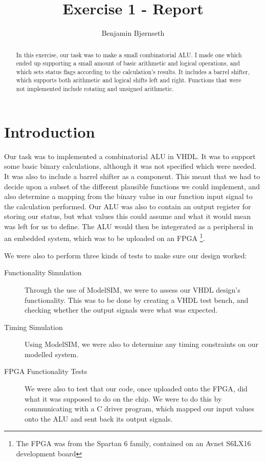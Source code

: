 \documentclass{article}
\title{Exercise 1 - Report}
\author{Benjamin Bj\o rnseth}
\begin{document}
\maketitle 
\begin{abstract}
In this exercise, our task was to make a small combinatorial ALU. I made one which ended up supporting a small amount of basic arithmetic and logical operations, and which sets status flags according to the calculation's results. It includes a barrel shifter, which supports both arithmetic and logical shifts left and right. Functions that were not implemented include rotating and unsigned arithmetic.
\end{abstract}

\section{Introduction}
\label{sec:introduction}
Our task was to implemented a combinatorial ALU in VHDL. It was to support some basic binary calculations, although it was not specified which were needed. It was also to include a barrel shifter as a component. This meant that we had to decide upon a subset of the different plausible functions we could implement, and also determine a mapping from the binary value in our function input signal to the calculation performed. Our ALU was also to contain an output register for storing our status, but what values this could assume and what it would mean was left for us to define. The ALU would then be integerated as a peripheral in an embedded system, which was to be uploaded on an FPGA \footnote{The FPGA was from the Spartan 6 family, contained on an Avnet S6LX16 development board}. 

We were also to perform three kinds of tests to make sure our design worked:
\begin{description}
\item[Functionality Simulation] Through the use of ModelSIM, we were to assess our VHDL design's functionality. This was to be done by creating a VHDL test bench, and checking whether the output signals were what was expected.
\item[Timing Simulation] Using ModelSIM, we were also to determine any timing constraints on our modelled system.
\item[FPGA Functionality Tests] We were also to test that our code, once uploaded onto the FPGA, did what it was supposed to do on the chip. We were to do this by communicating with a C driver program, which mapped our input values onto the ALU and sent back its output signals.
\end{description}
\end{document}
